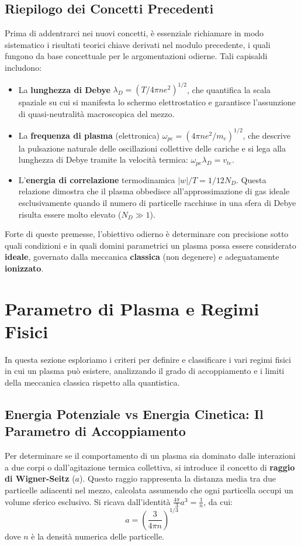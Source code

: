 \subsection{Riepilogo dei Concetti Precedenti}
Prima di addentrarci nei nuovi concetti, è essenziale richiamare in modo sistematico i risultati teorici chiave derivati nel modulo precedente, i quali fungono da base concettuale per le argomentazioni odierne. Tali capisaldi includono:
\begin{itemize}
\item La \textbf{lunghezza di Debye} $\lambda_D = (T / 4\pi n e^2)^{1/2}$, che quantifica la scala spaziale su cui si manifesta lo schermo elettrostatico e garantisce l'assunzione di quasi-neutralità macroscopica del mezzo.
\item La \textbf{frequenza di plasma} (elettronica) $\omega_{pe} = (4\pi n e^2 / m_e)^{1/2}$, che descrive la pulsazione naturale delle oscillazioni collettive delle cariche e si lega alla lunghezza di Debye tramite la velocità termica: $\omega_{pe}\lambda_D = v_{te}$.
\item L'\textbf{energia di correlazione} termodinamica $\vert{}w\vert{}/T = 1 / 12N_D$. Questa relazione dimostra che il plasma obbedisce all'approssimazione di gas ideale esclusivamente quando il numero di particelle racchiuse in una sfera di Debye risulta essere molto elevato ($N_D \gg 1$).
\end{itemize}
Forte di queste premesse, l'obiettivo odierno è determinare con precisione sotto quali condizioni e in quali domini parametrici un plasma possa essere considerato \textbf{ideale}, governato dalla meccanica \textbf{classica} (non degenere) e adeguatamente \textbf{ionizzato}.

\section{Parametro di Plasma e Regimi Fisici}

In questa sezione esploriamo i criteri per definire e classificare i vari regimi fisici in cui un plasma può esistere, analizzando il grado di accoppiamento e i limiti della meccanica classica rispetto alla quantistica.

\subsection{Energia Potenziale vs Energia Cinetica: Il Parametro di Accoppiamento}
Per determinare se il comportamento di un plasma sia dominato dalle interazioni a due corpi o dall'agitazione termica collettiva, si introduce il concetto di \textbf{raggio di Wigner-Seitz} ($a$). Questo raggio rappresenta la distanza media tra due particelle adiacenti nel mezzo, calcolata assumendo che ogni particella occupi un volume sferico esclusivo. Si ricava dall'identità $\frac{4\pi}{3} a^3 = \frac{1}{n}$, da cui:
\begin{equation}
a = \left( \frac{3}{4\pi n} \right)^{1/3}
\end{equation}
dove $n$ è la densità numerica delle particelle.

